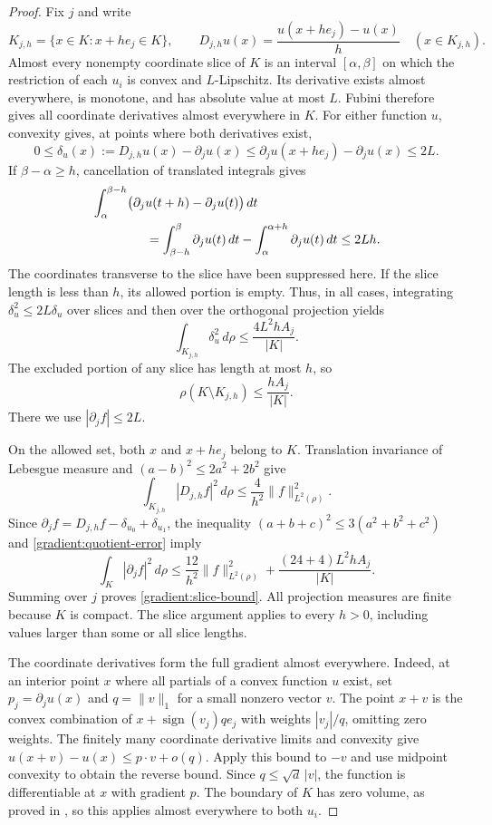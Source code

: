\begin{proof}
Fix $j$ and write
\[
 K_{j,h}=\{x\in K:x+he_j\in K\},\qquad
 D_{j,h}u(x)=\frac{u(x+he_j)-u(x)}{h}
 \quad(x\in K_{j,h}).
\]
Almost every nonempty coordinate slice of $K$ is an interval
$[\alpha,\beta]$ on which the restriction of each $u_i$ is convex and
$L$-Lipschitz.  Its derivative exists almost everywhere, is monotone, and
has absolute value at most $L$.  Fubini therefore gives all coordinate
derivatives almost everywhere in $K$.  For either function $u$, convexity
gives, at points where both derivatives exist,
\[
 0\le \delta_u(x):=D_{j,h}u(x)-\partial_j u(x)
 \le \partial_j u(x+he_j)-\partial_j u(x)\le 2L.
\]
If $\beta-\alpha\ge h$, cancellation of translated integrals gives
\begin{align*}
 &\int_\alpha^{\beta-h}
       \bigl(\partial_j u(t+h)-\partial_j u(t)\bigr)\,dt\\
 &\hspace{15mm}=
   \int_{\beta-h}^{\beta}\partial_j u(t)\,dt
       -\int_\alpha^{\alpha+h}\partial_j u(t)\,dt
   \le 2Lh.
\end{align*}
The coordinates transverse to the slice have been suppressed here.
If the slice length is less than $h$, its allowed portion is empty.
Thus, in all cases, integrating $\delta_u^2\le 2L\delta_u$ over slices
and then over the orthogonal projection yields
\begin{equation}\label{gradient:quotient-error}
 \int_{K_{j,h}}\delta_u^2\,d\rho
 \le \frac{4L^2hA_j}{|K|}.
\end{equation}
The excluded portion of any slice has length at most $h$, so
\[
 \rho(K\setminus K_{j,h})\le \frac{hA_j}{|K|}.
\]
There we use $|\partial_j f|\le 2L$.

On the allowed set, both $x$ and $x+he_j$ belong to $K$.  Translation
invariance of Lebesgue measure and $(a-b)^2\le 2a^2+2b^2$ give
\[
 \int_{K_{j,h}}|D_{j,h}f|^2\,d\rho
 \le \frac{4}{h^2}\|f\|_{L^2(\rho)}^2.
\]
Since
$\partial_jf=D_{j,h}f-\delta_{u_0}+\delta_{u_1}$, the inequality
$(a+b+c)^2\le 3(a^2+b^2+c^2)$ and
\eqref{gradient:quotient-error} imply
\[
 \int_K|\partial_jf|^2\,d\rho
 \le \frac{12}{h^2}\|f\|_{L^2(\rho)}^2
       +\frac{(24+4)L^2hA_j}{|K|}.
\]
Summing over $j$ proves \eqref{gradient:slice-bound}.  All projection
measures are finite because $K$ is compact.  The slice argument applies
to every $h>0$, including values larger than some or all slice lengths.

The coordinate derivatives form the full gradient almost everywhere.
Indeed, at an interior point $x$ where all partials of a convex function
$u$ exist, set $p_j=\partial_j u(x)$ and $q=\|v\|_1$ for a small nonzero
vector $v$.  The point $x+v$ is the convex combination of
$x+\operatorname{sign}(v_j)q e_j$ with weights $|v_j|/q$, omitting zero
weights.  The finitely many coordinate derivative limits and convexity
give $u(x+v)-u(x)\le p\cdot v+o(q)$.  Apply this bound to $-v$ and use
midpoint convexity to obtain the reverse bound.  Since
$q\le\sqrt d\,|v|$, the function is differentiable at $x$ with gradient
$p$.  The boundary of $K$ has zero volume, as proved in
, so this applies almost everywhere to both $u_i$.
\end{proof}

